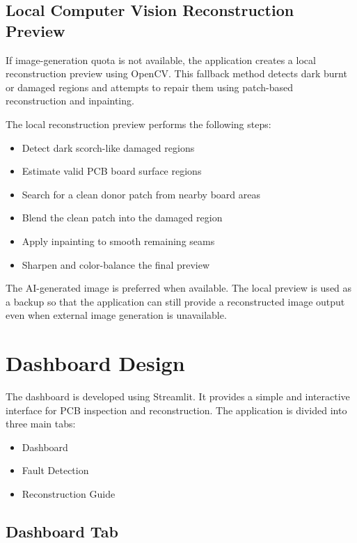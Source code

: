 \documentclass[12pt,a4paper]{report}
\begin{document}
\section{Local Computer Vision Reconstruction Preview}

If image-generation quota is not available, the application creates a local reconstruction preview using OpenCV. This fallback method detects dark burnt or damaged regions and attempts to repair them using patch-based reconstruction and inpainting.

The local reconstruction preview performs the following steps:

\begin{itemize}
    \item Detect dark scorch-like damaged regions
    \item Estimate valid PCB board surface regions
    \item Search for a clean donor patch from nearby board areas
    \item Blend the clean patch into the damaged region
    \item Apply inpainting to smooth remaining seams
    \item Sharpen and color-balance the final preview
\end{itemize}

The AI-generated image is preferred when available. The local preview is used as a backup so that the application can still provide a reconstructed image output even when external image generation is unavailable.

\chapter{Dashboard Design}

The dashboard is developed using Streamlit. It provides a simple and interactive interface for PCB inspection and reconstruction. The application is divided into three main tabs:

\begin{itemize}
    \item Dashboard
    \item Fault Detection
    \item Reconstruction Guide
\end{itemize}

\section{Dashboard Tab}
\end{document}
